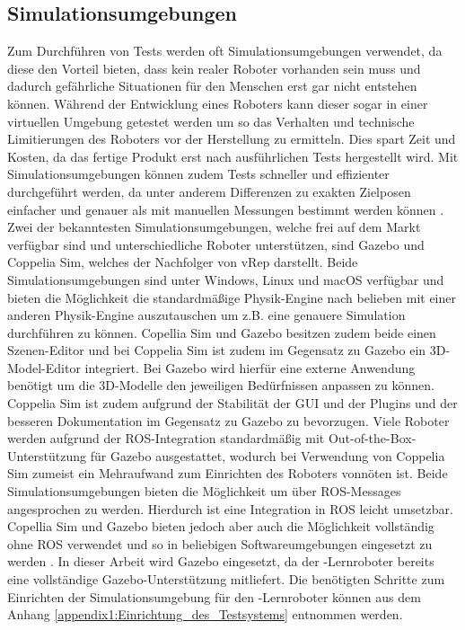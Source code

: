 \subsection{Simulationsumgebungen}
Zum Durchführen von Tests werden oft Simulationsumgebungen verwendet, da diese den Vorteil bieten, dass kein realer Roboter vorhanden sein muss und dadurch gefährliche Situationen für den Menschen erst gar nicht entstehen können. Während der Entwicklung eines Roboters kann dieser sogar in einer virtuellen Umgebung getestet werden um so das Verhalten und technische Limitierungen des Roboters vor der Herstellung zu ermitteln. Dies spart Zeit und Kosten, da das fertige Produkt erst nach ausführlichen Tests hergestellt wird. Mit Simulationsumgebungen können zudem Tests schneller und effizienter durchgeführt werden, da unter anderem Differenzen zu exakten Zielposen einfacher und genauer als mit manuellen Messungen bestimmt werden können \cite{gazebo_nodate}. Zwei der bekanntesten Simulationsumgebungen, welche frei auf dem Markt verfügbar sind und unterschiedliche Roboter unterstützen, sind Gazebo und Coppelia Sim, welches der Nachfolger von vRep darstellt. Beide Simulationsumgebungen sind unter Windows, Linux und macOS verfügbar und bieten die Möglichkeit die standardmäßige Physik-Engine nach belieben mit einer anderen Physik-Engine auszutauschen um z.B. eine genauere Simulation durchführen zu können. Copellia Sim und Gazebo besitzen zudem beide einen Szenen-Editor und bei Coppelia Sim ist zudem im Gegensatz zu Gazebo ein 3D-Model-Editor integriert. Bei Gazebo wird hierfür eine externe Anwendung benötigt um die 3D-Modelle den jeweiligen Bedürfnissen anpassen zu können. Coppelia Sim ist zudem aufgrund der Stabilität der GUI und der Plugins und der besseren Dokumentation im Gegensatz zu Gazebo zu bevorzugen. Viele Roboter werden aufgrund der ROS-Integration standardmäßig mit Out-of-the-Box-Unterstützung für Gazebo ausgestattet, wodurch bei Verwendung von Coppelia Sim zumeist ein Mehraufwand zum Einrichten des Roboters vonnöten ist. Beide Simulationsumgebungen bieten die Möglichkeit um über ROS-Messages angesprochen zu werden. Hierdurch ist eine Integration in ROS leicht umsetzbar. Copellia Sim und Gazebo bieten jedoch aber auch die Möglichkeit vollständig ohne ROS verwendet und so in beliebigen Softwareumgebungen eingesetzt zu werden \cite{vrep_vs_gazebo_nodate}. In dieser Arbeit wird Gazebo eingesetzt, da der -Lernroboter bereits eine vollständige Gazebo-Unterstützung mitliefert. Die benötigten Schritte zum Einrichten der Simulationsumgebung für den -Lernroboter können aus dem Anhang \ref{appendix1:Einrichtung_des_Testsystems} entnommen werden.

